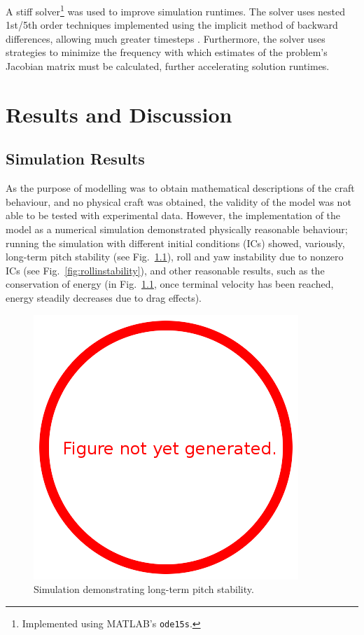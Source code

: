 \documentclass{sydeStyle}
\begin{document}
A stiff solver\footnote{Implemented using MATLAB's \texttt{ode15s}.} was used to
improve simulation runtimes.  The solver uses nested 1st/5th order techniques
implemented using the implicit method of backward differences, allowing much
greater timesteps \cite{SR97}.  Furthermore, the solver uses strategies to
minimize the frequency with which estimates of the problem's Jacobian matrix
must be calculated, further accelerating solution runtimes.

\chapter{Results and Discussion}
\label{sec:results}

\section{Simulation Results}
\label{sec:simresults}
As the purpose of modelling was to obtain mathematical descriptions of the craft
behaviour, and no physical craft was obtained, the validity of the model was not
able to be tested with experimental data.  However, the implementation of the
model as a numerical simulation demonstrated physically reasonable behaviour;
running the simulation with different initial conditions (ICs) showed,
variously, long-term pitch stability (see Fig.~\ref{fig:pitchstability}), roll
and yaw instability due to nonzero ICs (see Fig.~\ref{fig:rollinstability}), and
other reasonable results, such as the conservation of energy (in
Fig.~\ref{fig:pitchstability}, once terminal velocity has been reached, energy
steadily decreases due to drag effects).

\begin{figure}
    \begin{center}
        \includegraphics{figs/todo}
    \end{center}
    \caption{Simulation demonstrating long-term pitch stability.}
    \label{fig:pitchstability}
\end{figure}
\end{document}
